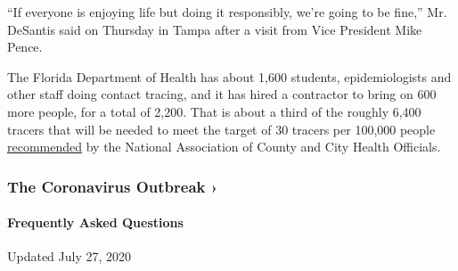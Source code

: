 ``If everyone is enjoying life but doing it responsibly, we're going to
be fine,'' Mr. DeSantis said on Thursday in Tampa after a visit from
Vice President Mike Pence.

The Florida Department of Health has about 1,600 students,
epidemiologists and other staff doing contact tracing, and it has hired
a contractor to bring on 600 more people, for a total of 2,200. That is
about a third of the roughly 6,400 tracers that will be needed to meet
the target of 30 tracers per 100,000 people
\href{https://www.naccho.org/uploads/full-width-images/Contact-Tracing-Statement-4-16-2020.pdf}{recommended}
by the National Association of County and City Health Officials.

\href{https://www.nytimes.com/news-event/coronavirus?action=click\&pgtype=Article\&state=default\&region=MAIN_CONTENT_3\&context=storylines_faq}{}

\hypertarget{the-coronavirus-outbreak-}{%
\subsubsection{The Coronavirus Outbreak
›}\label{the-coronavirus-outbreak-}}

\hypertarget{frequently-asked-questions}{%
\paragraph{Frequently Asked
Questions}\label{frequently-asked-questions}}

Updated July 27, 2020


